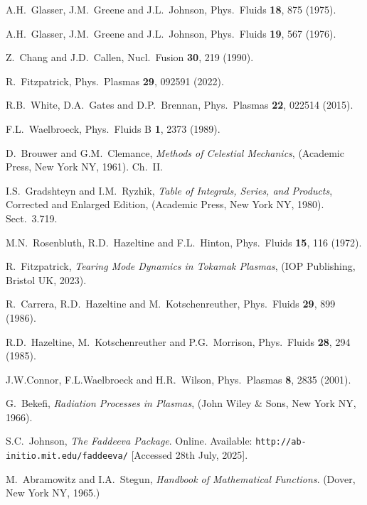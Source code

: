 \documentclass{iopjournal}
\begin{document}
{\begin{thebibliography}{99}
 A.H.~Glasser, J.M.~Greene and J.L.~Johnson, Phys.\ Fluids {\bf 18}, 875 (1975).

 A.H.~Glasser, J.M.~Greene  and J.L.~Johnson, Phys.\ Fluids {\bf 19}, 567 (1976).

 Z.~Chang and J.D.~Callen,  Nucl.\ Fusion {\bf 30}, 219 (1990).

 R.~Fitzpatrick, Phys.\ Plasmas {\bf 29}, 092591 (2022).

 R.B.~White, D.A.~Gates and D.P.~Brennan, Phys.\ Plasmas {\bf 22}, 022514 (2015). 

 F.L.~Waelbroeck, Phys.\ Fluids B {\bf 1}, 2373 (1989).

 D.~Brouwer and G.M.~Clemance, {\em Methods of Celestial Mechanics}, (Academic Press, New York NY, 1961).  Ch.~II.

 I.S.~Gradshteyn and I.M.~Ryzhik, {\em Table of Integrals, Series, and Products}, Corrected and Enlarged Edition, (Academic Press, New York NY, 1980). Sect.~3.719.

 M.N.~Rosenbluth, R.D.~Hazeltine and F.L.~Hinton, Phys.\ Fluids {\bf 15}, 116 (1972).

 R.~Fitzpatrick, {\em Tearing Mode Dynamics in Tokamak Plasmas}, (IOP Publishing, Bristol UK, 2023).

 R.~Carrera, R.D.~Hazeltine and M.~Kotschenreuther, Phys.\ Fluids {\bf 29}, 899 (1986). 

 R.D.~Hazeltine, M.~Kotschenreuther and P.G.~Morrison, Phys.\ Fluids {\bf 28}, 294 (1985). 

 J.W.Connor,  F.L.Waelbroeck and  H.R.~Wilson, Phys.\ Plasmas {\bf 8}, 2835 (2001). 

 G.~Bekefi, {\em Radiation Processes in Plasmas}, (John Wiley \& Sons, New York NY, 1966).

 S.C.~Johnson, {\em The Faddeeva Package}. Online. Available: {\tt http://ab-initio.mit.edu/faddeeva/} [Accessed 28th July, 2025].

 M.~Abramowitz and I.A.~Stegun, {\em Handbook of Mathematical Functions}. (Dover, New York NY, 1965.)

\end{thebibliography}

}
\end{document}

